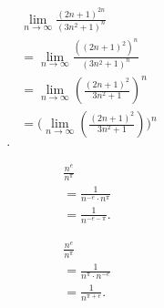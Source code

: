 \documentclass{report}
\begin{document}
    
    \begin{align*}
        &\lim\limits_{n \to \infty}{\frac{(2n+1)^{2n}}{(3n^{2}+1)^{n}}} \\
        &=\lim\limits_{n \to \infty}{\frac{((2n+1)^{2})^{n}}{(3n^{2} + 1)^{n}}} \\
        &=\lim\limits_{n \to \infty}{\left(\frac{(2n+1)^{2}}{3n^{2}+1}\right)^{n}} \\
        &=\bigg(\lim\limits_{n \to \infty}{\left(\frac{(2n+1)^{2}}{3n^{2}+1}\right)}\bigg)^{n} \\
    .\end{align*}

    \begin{align*}
        &\frac{n^{e}}{n^{\pi}} \\
        &=\frac{1}{n^{-e}\cdot n^{\pi}} \\
        &=\frac{1}{n^{-e-\pi}}
    .\end{align*}

    \begin{align*}
        &\frac{n^{e}}{n^{\pi}} \\
        &=\frac{1}{n^{\pi} \cdot n^{-e}} \\
        &=\frac{1}{n^{\pi+e}}
    .\end{align*}

    


    

        
\end{document}
